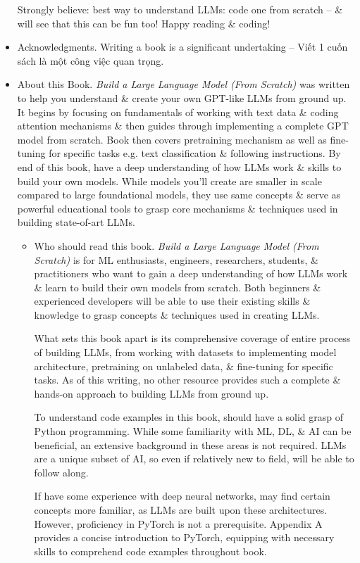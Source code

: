 \documentclass{article}
\begin{document}
\begin{itemize}
	Strongly believe: best way to understand LLMs: code one from scratch -- \& will see that this can be fun too! Happy reading \& coding!
	\item {\sf Acknowledgments.} Writing a book is a significant undertaking -- Viết 1 cuốn sách là một công việc quan trọng.
	\item {\sf About this Book.} {\it Build a Large Language Model (From Scratch)} was written to help you understand \& create your own GPT-like LLMs from ground up. It begins by focusing on fundamentals of working with text data \& coding attention mechanisms \& then guides through implementing a complete GPT model from scratch. Book then covers pretraining mechanism as well as fine-tuning for specific tasks e.g. text classification \& following instructions. By end of this book, have a deep understanding of how LLMs work \& skills to build your own models. While models you'll create are smaller in scale compared to large foundational models, they use same concepts \& serve as powerful educational tools to grasp core mechanisms \& techniques used in building state-of-art LLMs.
	\begin{itemize}
		\item {\sf Who should read this book.} {\it Build a Large Language Model (From Scratch)} is for ML enthusiasts, engineers, researchers, students, \& practitioners who want to gain a deep understanding of how LLMs work \& learn to build their own models from scratch. Both beginners \& experienced developers will be able to use their existing skills \& knowledge to grasp concepts \& techniques used in creating LLMs.
		
		What sets this book apart is its comprehensive coverage of entire process of building LLMs, from working with datasets to implementing model architecture, pretraining on unlabeled data, \& fine-tuning for specific tasks. As of this writing, no other resource provides such a complete \& hands-on approach to building LLMs from ground up.
		
		To understand code examples in this book, should have a solid grasp of Python programming. While some familiarity with ML, DL, \& AI can be beneficial, an extensive background in these areas is not required. LLMs are a unique subset of AI, so even if relatively new to field, will be able to follow along.
		
		If have some experience with deep neural networks, may find certain concepts more familiar, as LLMs are built upon these architectures. However, proficiency in PyTorch is not a prerequisite. Appendix A provides a concise introduction to PyTorch, equipping with necessary skills to comprehend code examples throughout book.
		

\end{itemize}
\end{itemize}
\end{document}
